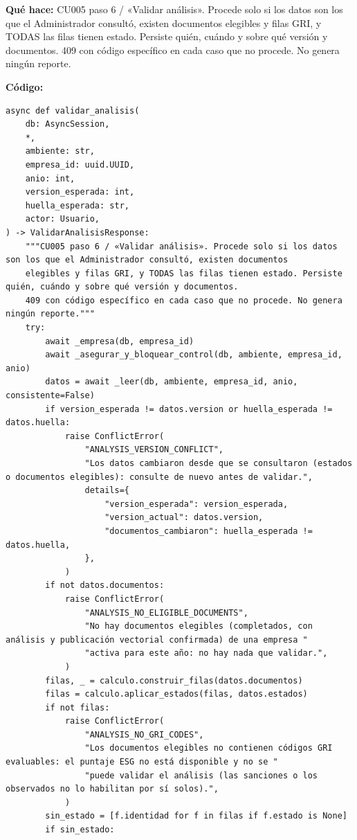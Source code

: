\documentclass[11pt,a4paper]{article}
\begin{document}
\textbf{Qué hace:} CU005 paso 6 / «Validar análisis». Procede solo si los datos son los que el Administrador consultó, existen documentos
elegibles y filas GRI, y TODAS las filas tienen estado. Persiste quién, cuándo y sobre qué versión y documentos.
409 con código específico en cada caso que no procede. No genera ningún reporte.

\textbf{Código:}
\begin{lstlisting}
async def validar_analisis(
    db: AsyncSession,
    *,
    ambiente: str,
    empresa_id: uuid.UUID,
    anio: int,
    version_esperada: int,
    huella_esperada: str,
    actor: Usuario,
) -> ValidarAnalisisResponse:
    """CU005 paso 6 / «Validar análisis». Procede solo si los datos son los que el Administrador consultó, existen documentos
    elegibles y filas GRI, y TODAS las filas tienen estado. Persiste quién, cuándo y sobre qué versión y documentos.
    409 con código específico en cada caso que no procede. No genera ningún reporte."""
    try:
        await _empresa(db, empresa_id)
        await _asegurar_y_bloquear_control(db, ambiente, empresa_id, anio)
        datos = await _leer(db, ambiente, empresa_id, anio, consistente=False)
        if version_esperada != datos.version or huella_esperada != datos.huella:
            raise ConflictError(
                "ANALYSIS_VERSION_CONFLICT",
                "Los datos cambiaron desde que se consultaron (estados o documentos elegibles): consulte de nuevo antes de validar.",
                details={
                    "version_esperada": version_esperada,
                    "version_actual": datos.version,
                    "documentos_cambiaron": huella_esperada != datos.huella,
                },
            )
        if not datos.documentos:
            raise ConflictError(
                "ANALYSIS_NO_ELIGIBLE_DOCUMENTS",
                "No hay documentos elegibles (completados, con análisis y publicación vectorial confirmada) de una empresa "
                "activa para este año: no hay nada que validar.",
            )
        filas, _ = calculo.construir_filas(datos.documentos)
        filas = calculo.aplicar_estados(filas, datos.estados)
        if not filas:
            raise ConflictError(
                "ANALYSIS_NO_GRI_CODES",
                "Los documentos elegibles no contienen códigos GRI evaluables: el puntaje ESG no está disponible y no se "
                "puede validar el análisis (las sanciones o los observados no lo habilitan por sí solos).",
            )
        sin_estado = [f.identidad for f in filas if f.estado is None]
        if sin_estado:

\end{lstlisting}
\end{document}
